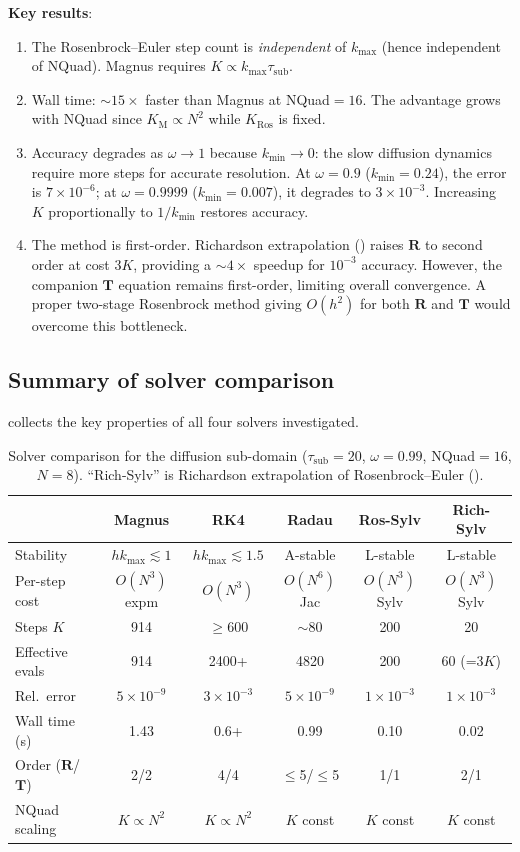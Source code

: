 \documentclass[11pt,a4paper]{article}
\newcommand{\mat}[1]{\mathbf{#1}}
\newcommand{\tsub}{\tau_{\mathrm{sub}}}
\newcommand{\kmax}{k_{\max}}
\newcommand{\kmin}{k_{\min}}
\theoremstyle{definition}
\begin{document}
\textbf{Key results}:
\begin{enumerate}[nosep]
\item The Rosenbrock--Euler step count is \emph{independent} of
  $\kmax$ (hence independent of NQuad).  Magnus requires
  $K\propto\kmax\tsub$.
\item Wall time: ${\sim}15\times$ faster than Magnus at NQuad${}=16$.
  The advantage grows with NQuad since $K_{\text{M}}\propto N^2$ while
  $K_{\text{Ros}}$ is fixed.
\item Accuracy degrades as $\omega\to 1$ because $\kmin\to 0$: the
  slow diffusion dynamics require more steps for accurate resolution.
  At $\omega=0.9$ ($\kmin=0.24$), the error is $7\times 10^{-6}$;
  at $\omega=0.9999$ ($\kmin=0.007$), it degrades to $3\times 10^{-3}$.
  Increasing $K$ proportionally to $1/\kmin$ restores accuracy.
\item The method is first-order.  Richardson extrapolation
  () raises $\mat{R}$ to second order at cost
  $3K$, providing a ${\sim}4\times$ speedup for $10^{-3}$ accuracy.
  However, the companion $\mat{T}$ equation remains first-order,
  limiting overall convergence.  A proper two-stage Rosenbrock method
  giving $O(h^2)$ for both $\mat{R}$ and $\mat{T}$ would overcome
  this bottleneck.
\end{enumerate}

\subsection{Summary of solver comparison}

 collects the key properties of all four
solvers investigated.

\begin{table}[h]\centering
\caption{Solver comparison for the diffusion sub-domain
($\tsub=20$, $\omega=0.99$, NQuad${}=16$, $N=8$).  ``Rich-Sylv'' is
Richardson extrapolation of Rosenbrock--Euler ().}
\label{tab:solver_summary}
\begin{tabular}{lccccc}
\toprule
& \textbf{Magnus} & \textbf{RK4} & \textbf{Radau}
& \textbf{Ros-Sylv} & \textbf{Rich-Sylv} \\
\midrule
Stability & $h\kmax\lesssim 1$
  & $h\kmax\lesssim 1.5$ & A-stable & L-stable & L-stable \\
Per-step cost & $O(N^3)$ expm & $O(N^3)$ & $O(N^6)$ Jac
  & $O(N^3)$ Sylv & $O(N^3)$ Sylv \\
Steps $K$ & 914 & $\geq 600$ & $\sim 80$ & 200 & 20 \\
Effective evals & 914 & 2400+ & 4820 & 200 & 60 (=$3K$) \\
Rel.\ error & $5\times 10^{-9}$ & $3\times 10^{-3}$ & $5\times 10^{-9}$
  & $1\times 10^{-3}$ & $1\times 10^{-3}$ \\
Wall time (s) & 1.43 & 0.6+ & 0.99 & 0.10 & 0.02 \\
Order ($\mat{R}$/$\mat{T}$) & 2/2 & 4/4 & $\leq$5/$\leq$5 & 1/1 & 2/1 \\
NQuad scaling & $K\propto N^2$ & $K\propto N^2$ & $K$ const
  & $K$ const & $K$ const \\
\bottomrule
\end{tabular}
\end{table}
\end{document}
